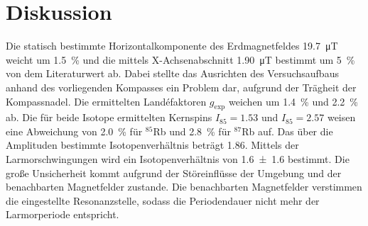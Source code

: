 \section{Diskussion}%
\label{sec:diskussion}
Die statisch bestimmte Horizontalkomponente des Erdmagnetfeldes
\SI{19.7}{\micro\tesla} weicht um
\SI{1.5}{\percent} und die mittels X-Achsenabschnitt \SI{1.90}{\micro\tesla} bestimmt um
\SI{5}{\percent} von dem Literaturwert ab.
Dabei stellte das Ausrichten des Versuchsaufbaus anhand des vorliegenden
Kompasses ein Problem dar, aufgrund der Trägheit der Kompassnadel.
Die ermittelten Land\'efaktoren $g_\text{exp}$ weichen um \SI{1.4}{\percent}
und \SI{2.2}{\percent} ab.
Die für beide Isotope ermittelten Kernspins $I_{85}=\num{1.53}$ und
$I_{85}=\num{2.57}$ weisen eine Abweichung von
\SI{2.0}{\percent} für $^{85}$Rb und \SI{2.8}{\percent} für
$^{87}$Rb auf.
Das über die Amplituden bestimmte Isotopenverhältnis beträgt \num{1.86}.
Mittels der Larmorschwingungen wird ein Isotopenverhältnis von \num{1.6 +- 1.6}
bestimmt.
Die große Unsicherheit kommt aufgrund der Störeinflüsse der Umgebung und der
benachbarten Magnetfelder zustande.
Die benachbarten Magnetfelder verstimmen die eingestellte Resonanzstelle,
sodass die Periodendauer nicht mehr der Larmorperiode entspricht.
